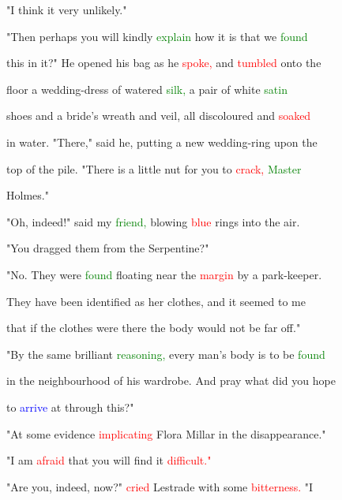  "I think it very unlikely."



 "Then perhaps you will kindly \textcolor{green}{explain} how it is that we \textcolor{green}{found}

 this in it?" He opened his bag as he \textcolor{red}{spoke,} and \textcolor{red}{tumbled} onto the

 floor a wedding-dress of watered \textcolor{green}{silk,} a pair of \textcolor{BurntOrange}{white} \textcolor{green}{satin}

 shoes and a \textcolor{BurntOrange}{bride's} wreath and veil, all discoloured and \textcolor{red}{soaked}

 in water. "There," said he, putting a new wedding-ring upon the

 \textcolor{BurntOrange}{top} of the pile. "There is a little nut for you to \textcolor{red}{crack,} \textcolor{green}{Master}

 Holmes."



 "Oh, indeed!" said my \textcolor{green}{friend,} blowing \textcolor{red}{blue} rings into the air.

 "You dragged them from the Serpentine?"



 "No. They were \textcolor{green}{found} floating near the \textcolor{red}{margin} by a park-keeper.

 They have been identified as her clothes, and it seemed to me

 that if the clothes were there the body would not be far off."



 "By the same \textcolor{BurntOrange}{brilliant} \textcolor{green}{reasoning,} every man's body is to be \textcolor{green}{found}

 in the neighbourhood of his wardrobe. And \textcolor{BurntOrange}{pray} what did you \textcolor{BurntOrange}{hope}

 to \textcolor{blue}{arrive} at through this?"



 "At some evidence \textcolor{red}{implicating} Flora Millar in the disappearance."



 "I am \textcolor{red}{afraid} that you will find it \textcolor{red}{difficult."}



 "Are you, indeed, now?" \textcolor{red}{cried} Lestrade with some \textcolor{red}{bitterness.} "I

